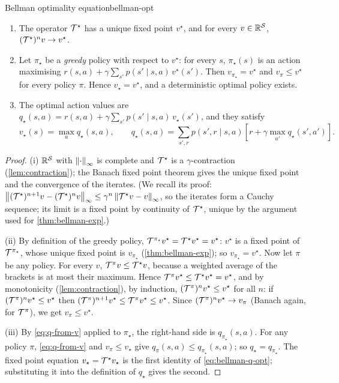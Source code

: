 \begin{theorem}{Bellman optimality equation}{bellman-opt}
  \begin{enumerate}[nosep, label=(\roman*)]
    \item The operator $\mathcal{T}^\star$ has a unique fixed point $v^\star$, and
      for every $v \in \mathbb{R}^{\mathcal{S}}$, $(\mathcal{T}^\star)^n v \to v^\star$.
    \item Let $\pi_\star$ be a \emph{greedy} policy with respect to
      $v^\star$: for every $s$, $\pi_\star(s)$ is an action maximising
      $r(s, a) + \gamma \sum_{s'} p(s' \mid s, a)\, v^\star(s')$. Then
      $v_{\pi_\star} = v^\star$ and $v_\pi \leq v^\star$ for every policy
      $\pi$. Hence $v_\star = v^\star$, and a deterministic optimal policy
      exists.
    \item The optimal action values are $q_\star(s, a) = r(s, a) + \gamma
      \sum_{s'} p(s' \mid s, a)\, v_\star(s')$, and they satisfy
      \begin{equation}
        \label{eq:bellman-q-opt}
        v_\star(s) = \max_a q_\star(s, a), \qquad
        q_\star(s, a) = \sum_{s', r} p(s', r \mid s, a)
          \left[ r + \gamma \max_{a'} q_\star(s', a') \right].
      \end{equation}
  \end{enumerate}
\end{theorem}

\begin{proof}
  (i) $\mathbb{R}^{\mathcal{S}}$ with $\left\lVert \cdot \right\rVert_\infty$ is complete and $\mathcal{T}^\star$
  is a $\gamma$-contraction (\cref{lem:contraction}); the Banach fixed point
  theorem gives the unique fixed point and the convergence of the
  iterates. (We recall its proof: $\left\lVert (\mathcal{T}^\star)^{n+1} v - (\mathcal{T}^\star)^n
  v \right\rVert_\infty \leq \gamma^n \left\lVert \mathcal{T}^\star v - v \right\rVert_\infty$, so the iterates
  form a Cauchy sequence; its limit is a fixed point by continuity of
  $\mathcal{T}^\star$, unique by the argument used for \cref{thm:bellman-exp}.)

  (ii) By definition of the greedy policy, $\mathcal{T}^{\pi_\star} v^\star =
  \mathcal{T}^\star v^\star = v^\star$: $v^\star$ is a fixed point of
  $\mathcal{T}^{\pi_\star}$, whose unique fixed point is $v_{\pi_\star}$
  (\cref{thm:bellman-exp}); so $v_{\pi_\star} = v^\star$. Now let $\pi$ be
  any policy. For every $v$, $\mathcal{T}^\pi v \leq \mathcal{T}^\star v$, because a weighted
  average of the brackets is at most their maximum. Hence $\mathcal{T}^\pi v^\star
  \leq \mathcal{T}^\star v^\star = v^\star$, and by monotonicity
  (\cref{lem:contraction}), by induction, $(\mathcal{T}^\pi)^n v^\star \leq
  v^\star$ for all $n$: if $(\mathcal{T}^\pi)^n v^\star \leq v^\star$ then
  $(\mathcal{T}^\pi)^{n+1} v^\star \leq \mathcal{T}^\pi v^\star \leq v^\star$. Since
  $(\mathcal{T}^\pi)^n v^\star \to v_\pi$ (Banach again, for $\mathcal{T}^\pi$), we get
  $v_\pi \leq v^\star$.

  (iii) By \eqref{eq:q-from-v} applied to $\pi_\star$, the right-hand side
  is $q_{\pi_\star}(s, a)$. For any policy $\pi$, \eqref{eq:q-from-v} and
  $v_\pi \leq v_\star$ give $q_\pi(s, a) \leq q_{\pi_\star}(s, a)$; so
  $q_\star = q_{\pi_\star}$. The fixed point equation $v_\star = \mathcal{T}^\star
  v_\star$ is the first identity of \eqref{eq:bellman-q-opt}; substituting
  it into the definition of $q_\star$ gives the second.
\end{proof}

